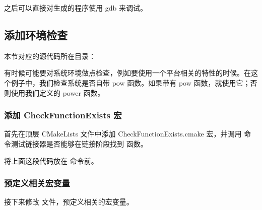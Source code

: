 \documentclass[a4paper,12pt,english]{sphinxmanual}
\begin{document}
\sphinxAtStartPar
之后可以直接对生成的程序使用 gdb 来调试。


\subsection{添加环境检查}
\label{\detokenize{dev-board/cmake:id11}}
\sphinxAtStartPar
本节对应的源代码所在目录：
\begin{quote}

\sphinxAtStartPar
{}
\end{quote}

\sphinxAtStartPar
有时候可能要对系统环境做点检查，例如要使用一个平台相关的特性的时候。在这个例子中，我们检查系统是否自带 pow 函数。如果带有 pow 函数，就使用它；否则使用我们定义的 power 函数。


\subsubsection{添加 CheckFunctionExists 宏}
\label{\detokenize{dev-board/cmake:checkfunctionexists}}
\sphinxAtStartPar
首先在顶层 CMakeLists 文件中添加 CheckFunctionExists.cmake 宏，并调用  命令测试链接器是否能够在链接阶段找到  函数。

\begin{sphinxVerbatim}[commandchars=\\\{\}]
 
 
\end{sphinxVerbatim}

\sphinxAtStartPar
将上面这段代码放在  命令前。


\subsubsection{预定义相关宏变量}
\label{\detokenize{dev-board/cmake:id12}}
\sphinxAtStartPar
接下来修改  文件，预定义相关的宏变量。
\end{document}
